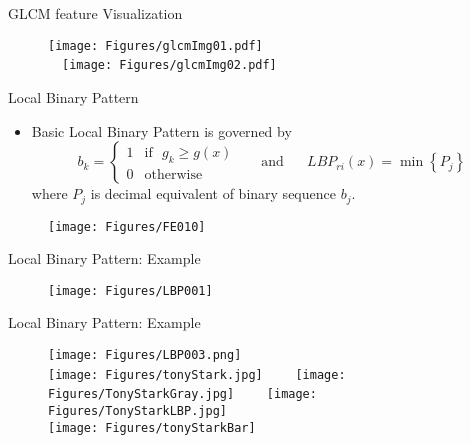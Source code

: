 \begin{frame}{GLCM feature Visualization}
\begin{figure}
\texttt{[image: Figures/glcmImg01.pdf]}\\
~~\texttt{[image: Figures/glcmImg02.pdf]}
\end{figure}
\end{frame}

\begin{frame}{Local Binary Pattern}
\vspace{-6pt}
\begin{small}
\begin{itemize}
\item Basic Local Binary Pattern is governed by
\[\boxed{{b_k} = \left\{ {\begin{array}{*{20}{c}}
  1&{\text{if~~}{g_k} \geqslant g(x)} \\ 
  0&\text{otherwise} 
\end{array}} \right.}\text{~~~~~and~~~~~}\boxed{LB{P_{ri}}(x) = \min \left\{ {{P_j}} \right\}}\]
where $P_j$ is decimal equivalent of binary sequence $b_j$.
\end{itemize}
\end{small}
\vspace{-6pt}
\begin{figure}
\centering
\texttt{[image: Figures/FE010]}
\end{figure}
\end{frame}

\begin{frame}{Local Binary Pattern: Example}
\begin{figure}
\centering
\texttt{[image: Figures/LBP001]}
\end{figure}
\end{frame}

\begin{frame}{Local Binary Pattern: Example}
\begin{figure}
\centering
\texttt{[image: Figures/LBP003.png]}\\\vspace{0.2cm}
\texttt{[image: Figures/tonyStark.jpg]}~~~~
\texttt{[image: Figures/TonyStarkGray.jpg]}~~~~
\texttt{[image: Figures/TonyStarkLBP.jpg]}\\
\texttt{[image: Figures/tonyStarkBar]}
\end{figure}
\end{frame}

